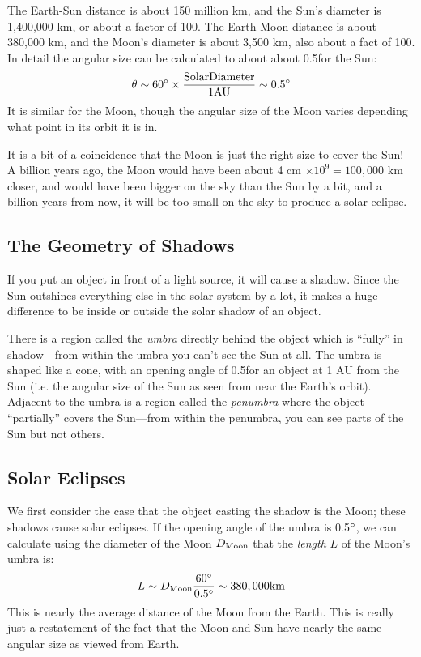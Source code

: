 \documentclass[12pt, preprint]{aastex}
\begin{document}
The Earth-Sun distance is about 150 million km, and the Sun's diameter
is 1,400,000 km, or about a factor of 100. The Earth-Moon distance is
about 380,000 km, and the Moon's diameter is about 3,500 km, also
about a fact of 100. In detail the angular size can be calculated to
about about 0.5\degree for the Sun:
\begin{equation}
\theta \sim 60{}^\circ \times \frac{\rm Solar Diameter}{\rm 1 AU} \sim
0.5{}^\circ
\end{equation}
It is similar for the Moon, though the angular size of the Moon varies
depending what point in its orbit it is in.

It is a bit of a coincidence that the Moon is just the right size to
cover the Sun! A billion years ago, the Moon would have been about 4
cm $\times10^9 = 100,000$ km closer, and would have been bigger on the
sky than the Sun by a bit, and a billion years from now, it will be
too small on the sky to produce a solar eclipse.

\subsection{The Geometry of Shadows}

If you put an object in front of a light source, it will cause a
shadow. Since the Sun outshines everything else in the solar system by
a lot, it makes a huge difference to be inside or outside the solar
shadow of an object.

There is a region called the {\it umbra} directly behind the object
which is ``fully'' in shadow---from within the umbra you can't see the
Sun at all. The umbra is shaped like a cone, with an opening angle of
0.5\degree for an object at 1 AU from the Sun (i.e. the angular size
of the Sun as seen from near the Earth's orbit). Adjacent to the umbra
is a region called the {\it penumbra} where the object ``partially''
covers the Sun---from within the penumbra, you can see parts of the
Sun but not others.

\subsection{Solar Eclipses}

We first consider the case that the object casting the shadow is the
Moon; these shadows cause solar eclipses. If the opening angle of the
umbra is 0.5${}^\circ$, we can calculate using the diameter of the Moon
$D_{\rm Moon}$ that the {\it length} $L$ of the Moon's umbra is:
\begin{equation}
L \sim D_{\rm Moon} \frac{60{}^\circ}{0.5{}^\circ} \sim 380,000 {\rm km}
\end{equation}
This is nearly the average distance of the Moon from the Earth. This
is really just a restatement of the fact that the Moon and Sun have
nearly the same angular size as viewed from Earth.
\end{document}
